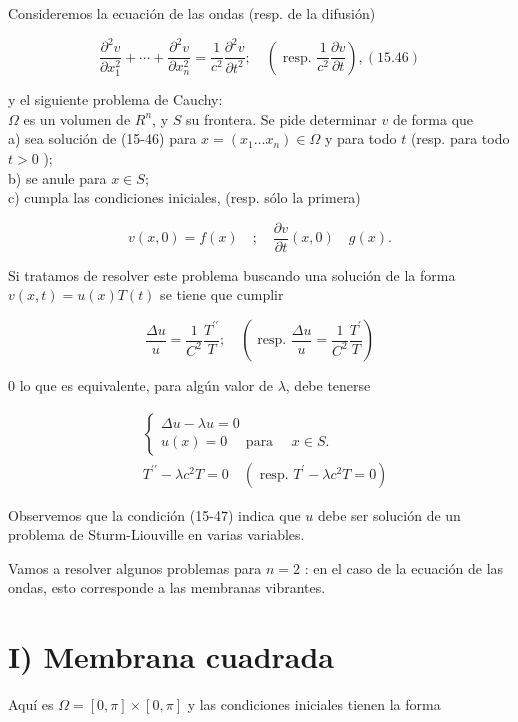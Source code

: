 \documentclass[10pt]{article}
\theoremstyle{plain}
\theoremstyle{definition}
\theoremstyle{remark}
\begin{document}
Consideremos la ecuación de las ondas (resp. de la difusión)

$$
\frac{\partial^{2} v}{\partial x_{1}^{2}}+\cdots+\frac{\partial^{2} v}{\partial x_{n}^{2}}=\frac{1}{c^{2}} \frac{\partial^{2} v}{\partial t^{2}} ; \quad\left(\text { resp. } \frac{1}{c^{2}} \frac{\partial v}{\partial t}\right),(15.46)
$$

y el siguiente problema de Cauchy:\\
$\Omega$ es un volumen de $R^{n}$, y $S$ su frontera. Se pide determinar $v$ de forma que\\
a) sea solución de (15-46) para $x=\left(x_{1} \ldots x_{n}\right) \in \Omega$ y para todo $t$ (resp. para todo $t>0$ );\\
b) se anule para $x \in S$;\\
c) cumpla las condiciones iniciales, (resp. sólo la primera)

$$
v(x, 0)=f(x) \quad ; \quad \frac{\partial v}{\partial t}(x, 0) \quad g(x) .
$$

Si tratamos de resolver este problema buscando una solución de la forma $v(x, t)=u(x) T(t)$ se tiene que cumplir

$$
\frac{\Delta u}{u}=\frac{1}{C^{2}} \frac{T^{\prime \prime}}{T} ; \quad\left(\text { resp. } \frac{\Delta u}{u}=\frac{1}{C^{2}} \frac{T^{\prime}}{T}\right)
$$

0 lo que es equivalente, para algún valor de $\lambda$, debe tenerse


\begin{align*}
& \left\{\begin{array}{l}
\Delta u-\lambda u=0 \\
u(x)=0 \quad \text { para } \quad x \in S .
\end{array}\right.  \tag{15-47}\\
& T^{\prime \prime}-\lambda c^{2} T=0 \quad\left(\text { resp. } T^{\prime}-\lambda c^{2} T=0\right)
\end{align*}


Observemos que la condición (15-47) indica que $u$ debe ser solución de un problema de Sturm-Liouville en varias variables.

Vamos a resolver algunos problemas para $n=2$ : en el caso de la ecuación de las ondas, esto corresponde a las membranas vibrantes.


\section*{I) Membrana cuadrada}
Aquí es $\Omega=[0, \pi] \times[0, \pi]$ y las condiciones iniciales tienen la forma
\end{document}
